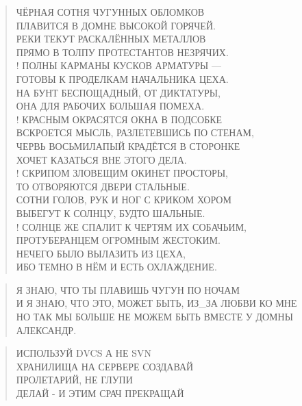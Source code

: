\poemtitle{***}
\begin{verse}
ЧЁРНАЯ СОТНЯ ЧУГУННЫХ ОБЛОМКОВ\\
ПЛАВИТСЯ В ДОМНЕ ВЫСОКОЙ ГОРЯЧЕЙ.\\
РЕКИ ТЕКУТ РАСКАЛЁННЫХ МЕТАЛЛОВ\\
ПРЯМО В ТОЛПУ ПРОТЕСТАНТОВ НЕЗРЯЧИХ.\\!
ПОЛНЫ КАРМАНЫ КУСКОВ АРМАТУРЫ —\\
ГОТОВЫ К ПРОДЕЛКАМ НАЧАЛЬНИКА ЦЕХА.\\
НА БУНТ БЕСПОЩАДНЫЙ, ОТ ДИКТАТУРЫ,\\
ОНА ДЛЯ РАБОЧИХ БОЛЬШАЯ ПОМЕХА.\\!
КРАСНЫМ ОКРАСЯТСЯ ОКНА В ПОДСОБКЕ\\
ВСКРОЕТСЯ МЫСЛЬ, РАЗЛЕТЕВШИСЬ ПО СТЕНАМ,\\
ЧЕРВЬ ВОСЬМИЛАПЫЙ КРАДЁТСЯ В СТОРОНКЕ\\
ХОЧЕТ КАЗАТЬСЯ ВНЕ ЭТОГО ДЕЛА.\\!
СКРИПОМ ЗЛОВЕЩИМ ОКИНЕТ ПРОСТОРЫ,\\
ТО ОТВОРЯЮТСЯ ДВЕРИ СТАЛЬНЫЕ.\\
СОТНИ ГОЛОВ, РУК И НОГ С КРИКОМ ХОРОМ\\
ВЫБЕГУТ К СОЛНЦУ, БУДТО ШАЛЬНЫЕ.\\!
СОЛНЦЕ ЖЕ СПАЛИТ К ЧЕРТЯМ ИХ СОБАЧЬИМ,\\
ПРОТУБЕРАНЦЕМ ОГРОМНЫМ ЖЕСТОКИМ.\\
НЕЧЕГО БЫЛО ВЫЛАЗИТЬ ИЗ ЦЕХА,\\
ИБО ТЕМНО В НЁМ И ЕСТЬ ОХЛАЖДЕНИЕ.
\end{verse}

\poemtitle{***}
\begin{verse}
Я ЗНАЮ, ЧТО ТЫ ПЛАВИШЬ ЧУГУН ПО НОЧАМ\\
И Я ЗНАЮ, ЧТО ЭТО, МОЖЕТ БЫТЬ, ИЗ\_ЗА ЛЮБВИ КО МНЕ\\
НО ТАК МЫ БОЛЬШЕ  НЕ МОЖЕМ БЫТЬ ВМЕСТЕ У ДОМНЫ\\
АЛЕКСАНДР.
\end{verse}

\poemtitle{***}
\begin{verse}
ИСПОЛЬЗУЙ DVCS А НЕ SVN\\
ХРАНИЛИЩА НА СЕРВЕРЕ СОЗДАВАЙ\\
ПРОЛЕТАРИЙ, НЕ ГЛУПИ\\
ДЕЛАЙ - И ЭТИМ СРАЧ ПРЕКРАЩАЙ
\end{verse}

